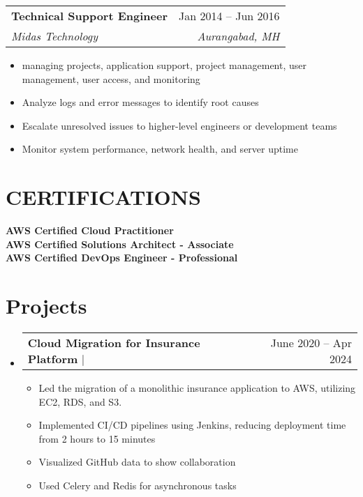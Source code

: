 \documentclass[letterpaper,11pt]{article}
\makeatletter
\newcommand{\resumeItem}[1]{
  \item\small{
    {#1 \vspace{-2pt}}
  }
}
\newcommand{\resumeSubheading}[4]{
  \vspace{-2pt}\item
    \begin{tabular*}{0.97\textwidth}[t]{l@{\extracolsep{\fill}}r}
      \textbf{#1} & #2 \\
      \textit{\small#3} & \textit{\small #4} \\
    \end{tabular*}\vspace{-7pt}
}
\newcommand{\resumeProjectHeading}[2]{
    \item
    \begin{tabular*}{0.97\textwidth}{l@{\extracolsep{\fill}}r}
      \small#1 & #2 \\
    \end{tabular*}\vspace{-7pt}
}
\newcommand{\resumeSubHeadingListStart}{\begin{itemize}[leftmargin=0.15in, label={}]}
\newcommand{\resumeSubHeadingListEnd}{\end{itemize}}
\newcommand{\resumeItemListStart}{\begin{itemize}}
\newcommand{\resumeItemListEnd}{\end{itemize}\vspace{-5pt}}
\makeatother
\begin{document}
      \resumeSubheading
      {Technical Support Engineer}{Jan 2014 -- Jun 2016}
      {Midas Technology}{Aurangabad, MH}
      \resumeItemListStart
        \resumeItem{managing projects, application support, project management, user management, user access, and monitoring}
        \resumeItem{Analyze logs and error messages to identify root causes}
        \resumeItem{Escalate unresolved issues to higher-level engineers or development teams}
        \resumeItem{Monitor system performance, network health, and server uptime}
  \resumeSubHeadingListEnd


\section{CERTIFICATIONS}
 \begin{itemize}[leftmargin=0.15in, label={}]
    \small{\item{
     \textbf{AWS Certified Cloud Practitioner}\\
     \textbf{AWS Certified Solutions Architect - Associate} \\
     \textbf{AWS Certified DevOps Engineer - Professional}\\
    }}
 \end{itemize}



\section{Projects}
    \resumeSubHeadingListStart
      \resumeProjectHeading
          {\textbf{Cloud Migration for Insurance Platform} $|$ \emph}{June 2020 -- Apr 2024}
          \resumeItemListStart
            \resumeItem{Led the migration of a monolithic insurance application to AWS, utilizing EC2, RDS, and S3.}
            \resumeItem{Implemented CI/CD pipelines using Jenkins, reducing deployment time from 2 hours to 15 minutes}
            \resumeItem{Visualized GitHub data to show collaboration}
            \resumeItem{Used Celery and Redis for asynchronous tasks}
          \resumeItemListEnd

    \resumeSubHeadingListEnd



%
\end{document}
